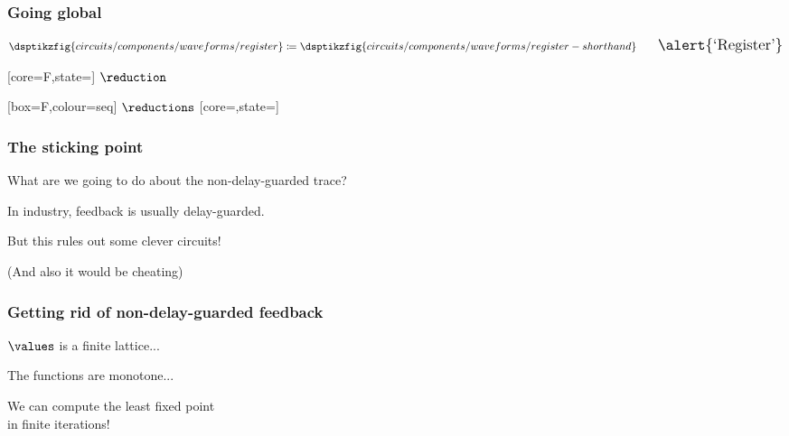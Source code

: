 \begin{frame}
    \frametitle{Going global}

    \centering
    \Large

    \await

    \normalsize
    \begin{gather*}
        \dsptikzfig{circuits/components/waveforms/register}
        \coloneqq
        \dsptikzfig{circuits/components/waveforms/register-shorthand}
        \qquad
        \Large
        \text{\alert{`Register'}}
    \end{gather*}

    \vspace{1em}

    \await

    [core=F,state=]
    \Large\(\reduction\)\normalsize

    \await

    [box=F,colour=seq]
    \Large\(\reductions\)\normalsize
    [core=,state=]

\end{frame}
\begin{frame}
    \frametitle{The sticking point}

    \centering

    What are we going to do about the non-delay-guarded trace?

    \await

    In industry, feedback is usually \alert{delay-guarded}.

    \await

    But this rules out some \alert{clever} circuits!

    \normalsize

    \vspace{1em}


    \await

    \vspace{1em}

    \scriptsize
    (And also it would be cheating)

\end{frame}
\begin{frame}
    \frametitle{Getting rid of non-delay-guarded feedback}

    \centering
    \LARGE

    \(\values\) is a \alert{finite} lattice...\

    \await
    The functions are monotone...

    \await
    We can compute the \alert{least fixed point} \\ in finite iterations!

\end{frame}
